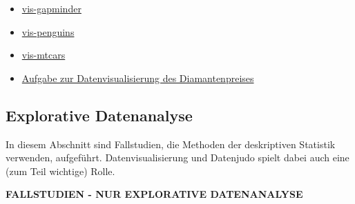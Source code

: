\documentclass[
  a4paper,
]{scrbook}
\theoremstyle{definition}
\theoremstyle{definition}
\theoremstyle{definition}
\theoremstyle{remark}
\begin{document}
\begin{itemize}
\item
  \href{https://datenwerk.netlify.app/posts/vis-gapminder/vis-gapminder}{vis-gapminder}
\item
  \href{https://datenwerk.netlify.app/posts/vis-penguins/vis-penguins}{vis-penguins}
\item
  \href{https://datenwerk.netlify.app/posts/vis-mtcars/vis-mtcars}{vis-mtcars}
\item
  \href{https://data-se.netlify.app/2020/12/07/ex-visualizing-diamonds/}{Aufgabe
  zur Datenvisualisierung des Diamantenpreises}
\end{itemize}

\subsection{Explorative Datenanalyse}\label{explorative-datenanalyse}

In diesem Abschnitt sind Fallstudien, die Methoden der deskriptiven
Statistik verwenden, aufgeführt. Datenvisualisierung und Datenjudo
spielt dabei auch eine (zum Teil wichtige) Rolle.

\textbf{FALLSTUDIEN - NUR EXPLORATIVE DATENANALYSE}
\end{document}
